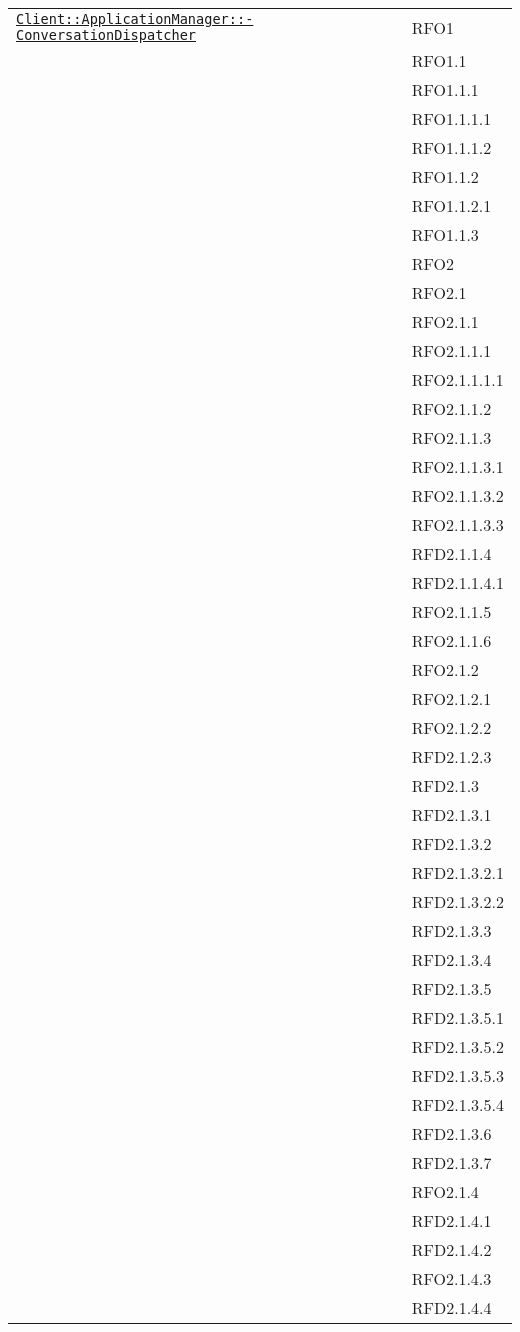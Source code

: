 \begin{longtable}{|>{\centering}m{10cm}|m{3cm}<{\centering}|}
\hyperref[Client::ApplicationManager::ConversationDispatcher]{\texttt{Client::ApplicationManager::-\linebreak ConversationDispatcher}} & RFO1\\
& RFO1.1\\
& RFO1.1.1\\
& RFO1.1.1.1\\
& RFO1.1.1.2\\
& RFO1.1.2\\
& RFO1.1.2.1\\
& RFO1.1.3\\
& RFO2\\
& RFO2.1\\
& RFO2.1.1\\
& RFO2.1.1.1\\
& RFO2.1.1.1.1\\
& RFO2.1.1.2\\
& RFO2.1.1.3\\
& RFO2.1.1.3.1\\
& RFO2.1.1.3.2\\
& RFO2.1.1.3.3\\
& RFD2.1.1.4\\
& RFD2.1.1.4.1\\
& RFO2.1.1.5\\
& RFO2.1.1.6\\
& RFO2.1.2\\
& RFO2.1.2.1\\
& RFO2.1.2.2\\
& RFD2.1.2.3\\
& RFD2.1.3\\
& RFD2.1.3.1\\
& RFD2.1.3.2\\
& RFD2.1.3.2.1\\
& RFD2.1.3.2.2\\
& RFD2.1.3.3\\
& RFD2.1.3.4\\
& RFD2.1.3.5\\
& RFD2.1.3.5.1\\
& RFD2.1.3.5.2\\
& RFD2.1.3.5.3\\
& RFD2.1.3.5.4\\
& RFD2.1.3.6\\
& RFD2.1.3.7\\
& RFO2.1.4\\
& RFD2.1.4.1\\
& RFD2.1.4.2\\
& RFO2.1.4.3\\
& RFD2.1.4.4\\

\end{longtable}

